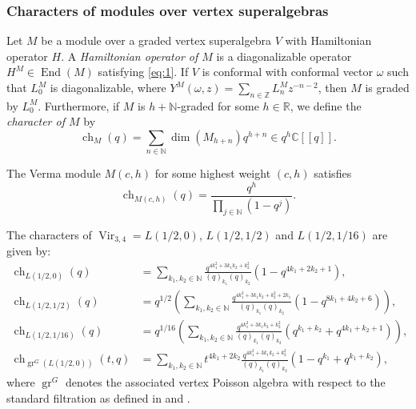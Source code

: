 \documentclass{beamer}
\DeclareMathOperator{\Vir}{Vir}
\DeclareMathOperator{\gr}{gr}
\DeclareMathOperator{\End}{End}
\DeclareMathOperator{\ch}{ch}
\begin{document}
\begin{frame}
  \frametitle{Characters of modules over vertex superalgebras}

  Let $M$ be a module over a graded vertex superalgebra $V$ with Hamiltonian operator $H$.
  A \emph{Hamiltonian operator of $M$} is a diagonalizable operator $H^M \in \End(M)$ satisfying \eqref{eq:1}.
  If $V$ is conformal with conformal vector $\omega$ such that $L_0^M$ is diagonalizable, where $Y^M(\omega, z) = \sum_{n \in \mathbb{Z}}L_n^Mz^{-n - 2}$, then $M$ is graded by $L_0^M$.
  Furthermore, if $M$ is $h + \mathbb{N}$-graded for some $h \in \mathbb{R}$, we define the \emph{character of $M$} by
  \begin{equation*}
    \ch_M(q) = \sum_{n \in \mathbb{N}}\dim(M_{h + n})q^{h + n} \in q^h\mathbb{C}[[q]].
  \end{equation*}

  \begin{example}
    \label{exa:4}
    The Verma module $M(c, h)$ for some highest weight $(c, h)$ satisfies
    \begin{equation*}
      \ch_{M(c, h)}(q) = \frac{q^h}{\prod_{j \in \mathbb{N}}(1 - q^j)}.
    \end{equation*}
  \end{example}

\end{frame}

\begin{frame}

  \begin{theorem}
    \label{thr:4}
    The characters of $\Vir_{3, 4} = L(1/2, 0)$, $L(1/2, 1/2)$ and $L(1/2, 1/16)$ are given by:
    \footnotesize
    \begin{align*}
      \ch_{L(1/2, 0)}(q) &= \sum_{k_1, k_2 \in \mathbb{N}}\frac{q^{4k_1^2 + 3k_1k_2 + k_2^2}}{(q)_{k_1}(q)_{k_2}}(1 - q^{4k_1 + 2k_2 +1}), \\
      \ch_{L(1/2, 1/2)}(q) &= q^{1/2}\left(\sum_{k_1, k_2 \in \mathbb{N}}\frac{q^{4k_1^2 +3k_1k_2 + k_2^2 + 2k_1}}{(q)_{k_1}(q)_{k_2}}(1 - q^{8k_1 + 4k_2 + 6})\right), \\
      \ch_{L(1/2, 1/16)}(q) &= q^{1/16}\left(\sum_{k_1, k_2 \in \mathbb{N}}\frac{q^{4k_1^2 + 3k_1k_2 + k_2^2}}{(q)_{k_1}(q)_{k_2}}(q^{k_1 + k_2} + q^{4k_1 + k_2 + 1})\right), \\
      \ch_{\gr^G(L(1/2, 0))}(t, q) &= \sum_{k_1, k_2 \in \mathbb{N}}t^{4k_1 + 2k_2}\frac{q^{4k_1^2 + 3k_1k_2 + k_2^2}}{(q)_{k_1}(q)_{k_2}}(1 - q^{k_1} + q^{k_1 + k_2}),
    \end{align*}
    \normalsize
    where $\gr^G$ denotes the associated vertex Poisson algebra with respect to the standard filtration as defined in \cite{li_vertex_2004} and \cite{arakawa_remark_2012}.
  \end{theorem}

\end{frame}
\end{document}
